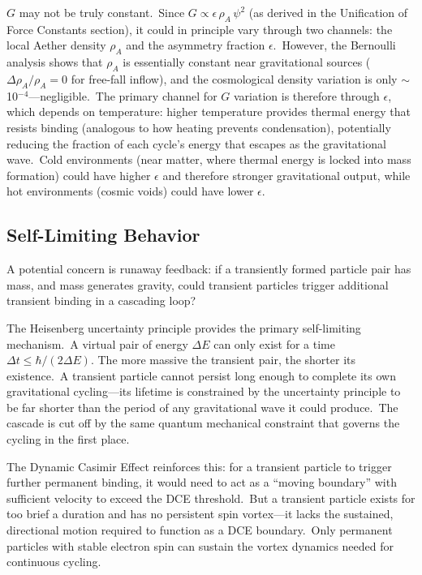 ﻿\documentclass[12pt,letterpaper]{article}
\newcommand{\rhoa}{\rho_{\!A}}
\begin{document}
$G$ may not be truly constant.\ Since $G \propto \epsilon \, \rhoa \, \psi^2$ (as
derived in the Unification of Force Constants section), it could in principle vary through
two channels: the local Aether density $\rhoa$ and the asymmetry fraction $\epsilon$.\
However, the Bernoulli analysis shows that $\rhoa$ is essentially constant near
gravitational sources ($\Delta\rhoa/\rhoa = 0$ for free-fall inflow), and the cosmological
density variation is only $\sim$10$^{-4}$---negligible.\ The primary channel for $G$
variation is therefore through $\epsilon$, which depends on temperature: higher temperature
provides thermal energy that resists binding (analogous to how heating prevents
condensation), potentially reducing the fraction of each cycle's energy that escapes as
the gravitational wave.\ Cold environments (near matter, where thermal energy is locked
into mass formation) could have higher $\epsilon$ and therefore stronger gravitational
output, while hot environments (cosmic voids) could have lower $\epsilon$.


\subsection{Self-Limiting Behavior}

A potential concern is runaway feedback: if a transiently formed particle pair has mass,
and mass generates gravity, could transient particles trigger additional transient binding
in a cascading loop?

The Heisenberg uncertainty principle provides the primary self-limiting mechanism.\ A
virtual pair of energy $\Delta E$ can only exist for a time $\Delta t \leq \hbar / (2\Delta E)$.
The more massive the transient pair, the shorter its existence.\ A transient particle cannot
persist long enough to complete its own gravitational cycling---its lifetime is
constrained by the uncertainty principle to be far shorter than the period of any
gravitational wave it could produce.\ The cascade is cut off by the same quantum mechanical
constraint that governs the cycling in the first place.

The Dynamic Casimir Effect reinforces this: for a transient particle to trigger further
permanent binding, it would need to act as a ``moving boundary'' with sufficient velocity
to exceed the DCE threshold.\ But a transient particle exists for too brief a duration and
has no persistent spin vortex---it lacks the sustained, directional motion required to
function as a DCE boundary.\ Only permanent particles with stable electron spin can sustain
the vortex dynamics needed for continuous cycling.
\end{document}
